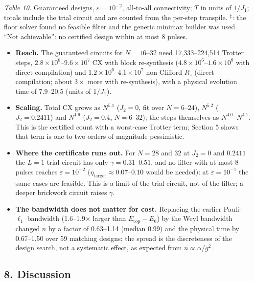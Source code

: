 \documentclass[
]{article}
\providecommand{\tightlist}{%
  \setlength{\itemsep}{0pt}\setlength{\parskip}{0pt}}
\begin{document}
\emph{Table 10.} Guaranteed designs, \(\varepsilon=10^{-2}\), all-to-all
connectivity; \(T\) in units of \(1/J_1\); totals include the trial
circuit and are counted from the per-step transpile. \(^\ddagger\): the
floor solver found no feasible filter and the generic minimax builder
was used. ``Not achievable'': no certified design within at most 8
pulses.

\begin{itemize}
\tightlist
\item
  \textbf{Reach.} The guaranteed circuits for \(N=16\)--\(32\) need
  17,333--224,514 Trotter steps,
  \(2.8\times10^{6}\)--\(9.6\times10^{7}\) CX with block re-synthesis
  (\(4.8\times10^{6}\)--\(1.6\times10^{8}\) with direct compilation) and
  \(1.2\times10^{6}\)--\(4.1\times10^{7}\) non-Clifford \(R_z\) (direct
  compilation; about \(3\times\) more with re-synthesis), with a
  physical evolution time of 7.9--20.5 (units of \(1/J_1\)).
\item
  \textbf{Scaling.} Total CX grows as \(N^{5.1}\) (\(J_2=0\), fit over
  \(N=6\text{--}24\)), \(N^{5.2}\) (\(J_2=0.2411\)) and \(N^{4.9}\)
  (\(J_2=0.4\), \(N=6\text{--}32\)); the steps themselves as
  \(N^{4.0}\)--\(N^{4.1}\). This is the certified count with a
  worst-case Trotter term; Section 5 shows that term is one to two
  orders of magnitude pessimistic.
\item
  \textbf{Where the certificate runs out.} For \(N=28\) and \(32\) at
  \(J_2=0\) and \(0.2411\) the \(L=1\) trial circuit has only
  \(\gamma=0.31\)--\(0.51\), and no filter with at most 8 pulses reaches
  \(\varepsilon=10^{-2}\)
  (\(\eta_{\mathrm{target}}\approx0.07\)--\(0.10\) would be needed): at
  \(\varepsilon=10^{-1}\) the same cases are feasible. This is a limit
  of the trial circuit, not of the filter; a deeper brickwork circuit
  raises \(\gamma\).
\item
  \textbf{The bandwidth does not matter for cost.} Replacing the earlier
  Pauli-\(\ell_1\) bandwidth (1.6--1.9\(\times\) larger than
  \(E_{\mathrm{top}}-E_0\)) by the Weyl bandwidth changed \(n\) by a
  factor of 0.63--1.14 (median 0.99) and the physical time by 0.67--1.50
  over 59 matching designs; the spread is the discreteness of the design
  search, not a systematic effect, as expected from
  \(n\propto\alpha/g^2\).
\end{itemize}

\hypertarget{discussion}{%
\subsection{8. Discussion}\label{discussion}}
\end{document}
